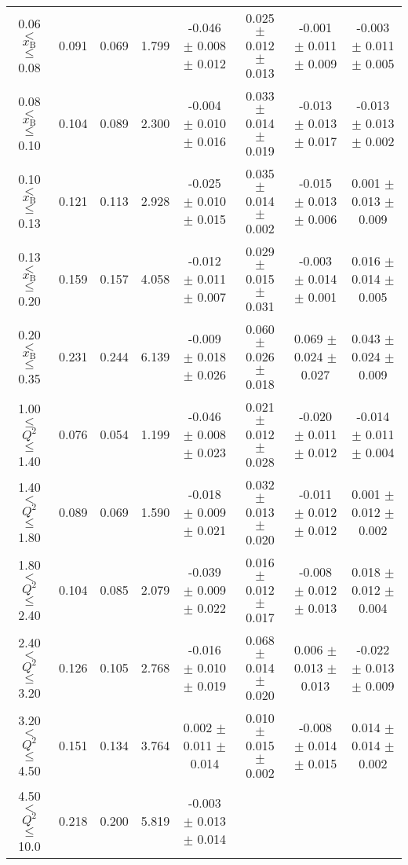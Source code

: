 \begin{table}[width=15cm]
\begin{center}
{\begin{tabular}{|c|c|c|c|c|c|c|c|}
0.06 $<$ $x_{\textrm{B}}$ $\leqslant$ 0.08 &  0.091 & 0.069 &  1.799 &   -0.046  $\pm$  0.008  $\pm$   0.012 &
0.025  $\pm$  0.012  $\pm$   0.013 & -0.001  $\pm$ 0.011  $\pm$   0.009 & -0.003   $\pm$  0.011   $\pm$   0.005\\
0.08 $<$ $x_{\textrm{B}}$ $\leqslant$ 0.10 &  0.104 & 0.089 &  2.300 &  -0.004  $\pm$  0.010  $\pm$   0.016 & 
0.033  $\pm$  0.014  $\pm$   0.019 & -0.013 $\pm$  0.013 $\pm$    0.017 & -0.013   $\pm$  0.013    $\pm$  0.002\\
0.10 $<$ $x_{\textrm{B}}$ $\leqslant$ 0.13 &  0.121 &  0.113 &  2.928 &  -0.025  $\pm$  0.010  $\pm$   0.015 & 
0.035  $\pm$  0.014 $\pm$   0.002 & -0.015 $\pm$  0.013  $\pm$   0.006 & 0.001   $\pm$  0.013  $\pm$    0.009\\
0.13 $<$ $x_{\textrm{B}}$ $\leqslant$ 0.20 &  0.159 & 0.157 &  4.058&   -0.012   $\pm$ 0.011  $\pm$   0.007 & 
0.029  $\pm$  0.015 $\pm$    0.031 & -0.003  $\pm$  0.014  $\pm$   0.001 & 0.016   $\pm$  0.014   $\pm$  0.005\\
0.20 $<$ $x_{\textrm{B}}$ $\leqslant$ 0.35 &  0.231 & 0.244 &  6.139 &  -0.009 $\pm$  0.018   $\pm$  0.026 & 
0.060  $\pm$  0.026   $\pm$    0.018 & 0.069  $\pm$  0.024  $\pm$ 0.027 & 0.043  $\pm$   0.024  $\pm$   0.009\\
\hline
1.00 $\leqslant$ $Q^{2}$ $\leqslant$ 1.40 &  0.076 & 0.054  & 1.199 &  -0.046  $\pm$  0.008  $\pm$   0.023 & 
0.021  $\pm$  0.012  $\pm$   0.028 &  -0.020 $\pm$  0.011  $\pm$  0.012 & -0.014  $\pm$  0.011   $\pm$   0.004\\
1.40 $<$ $Q^{2}$ $\leqslant$ 1.80 &  0.089 & 0.069 &  1.590 &  -0.018  $\pm$  0.009  $\pm$   0.021 & 
0.032  $\pm$  0.013  $\pm$   0.020 & -0.011  $\pm$  0.012  $\pm$  0.012 & 0.001  $\pm$  0.012   $\pm$  0.002\\
1.80 $<$ $Q^{2}$ $\leqslant$ 2.40 &  0.104 & 0.085 &  2.079 &  -0.039  $\pm$  0.009  $\pm$   0.022 &
0.016  $\pm$  0.012  $\pm$   0.017 & -0.008 $\pm$   0.012  $\pm$  0.013 & 0.018  $\pm$   0.012  $\pm$  0.004\\
2.40 $<$ $Q^{2}$ $\leqslant$ 3.20 &  0.126 & 0.105  & 2.768 &  -0.016 $\pm$   0.010  $\pm$   0.019 &  
0.068  $\pm$  0.014  $\pm$   0.020 & 0.006  $\pm$  0.013  $\pm$  0.013 & -0.022  $\pm$  0.013  $\pm$  0.009\\
3.20 $<$ $Q^{2}$ $\leqslant$ 4.50 &  0.151 & 0.134 &  3.764 &  0.002  $\pm$  0.011   $\pm$  0.014 & 
0.010 $\pm$   0.015  $\pm$   0.002 & -0.008  $\pm$  0.014 $\pm$ 0.015 & 0.014   $\pm$  0.014  $\pm$  0.002\\
4.50 $<$ $Q^{2}$ $\leqslant$ 10.0 &  0.218 & 0.200 &  5.819 &  -0.003  $\pm$  0.013  $\pm$   0.014 & 

\end{tabular}}
\end{center}
\end{table}
